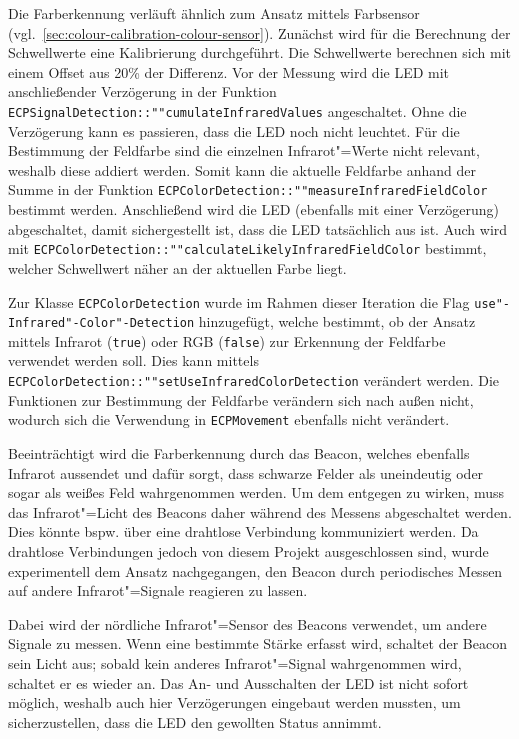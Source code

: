 {Die Farberkennung verläuft ähnlich zum Ansatz mittels Farbsensor (vgl.~\autoref{sec:colour-calibration-colour-sensor}). Zunächst wird für die Berechnung der Schwellwerte eine Kalibrierung durchgeführt.
Die Schwellwerte berechnen sich mit einem Offset aus 20\% der Differenz.
Vor der Messung wird die LED mit anschließender Verzögerung in der Funktion \texttt{ECP\-Signal\-Detection::""cumulate\-Infrared\-Values} angeschaltet. Ohne die Verzögerung kann es passieren, dass die LED noch nicht leuchtet. Für die Bestimmung  der Feldfarbe sind die einzelnen Infrarot"=Werte nicht relevant, weshalb diese addiert werden. Somit kann die aktuelle Feldfarbe anhand der Summe in der Funktion \texttt{ECP\-Color\-Detection::""measure\-Infrared\-Field\-Color} bestimmt werden. Anschließend wird die LED (ebenfalls mit einer Verzögerung) abgeschaltet, damit sichergestellt ist, dass die LED tatsächlich aus ist. Auch wird mit \texttt{ECP\-Color\-Detection::""calculate\-Likely\-Infrared\-Field\-Color} bestimmt, welcher Schwellwert näher an der aktuellen Farbe liegt. 


Zur Klasse \texttt{ECP\-Color\-Detection} wurde im Rahmen dieser Iteration die Flag \texttt{use"-Infrared"-Color"-Detection} hinzugefügt, welche bestimmt, ob der Ansatz mittels Infrarot (\texttt{true}) oder RGB (\texttt{false}) zur Erkennung der Feldfarbe verwendet werden soll. Dies kann mittels \texttt{ECP\-Color\-Detection::""set\-Use\-Infrared\-Color\-Detection} verändert werden. Die Funktionen zur Bestimmung der Feldfarbe verändern sich nach außen nicht, wodurch sich die Verwendung in \texttt{ECP\-Movement} ebenfalls nicht verändert.

Beeinträchtigt wird die Farberkennung durch das Beacon, welches ebenfalls Infrarot aussendet und dafür sorgt, dass schwarze Felder als uneindeutig oder sogar als weißes Feld wahrgenommen werden. Um dem entgegen zu wirken, muss das Infrarot"=Licht des Beacons daher während des Messens abgeschaltet werden. Dies könnte bspw. über eine drahtlose Verbindung kommuniziert werden. Da drahtlose Verbindungen jedoch von diesem Projekt ausgeschlossen sind, wurde experimentell dem Ansatz nachgegangen, den Beacon durch periodisches Messen auf andere Infrarot"=Signale reagieren zu lassen.

Dabei wird der nördliche Infrarot"=Sensor des Beacons verwendet, um andere Signale zu messen. Wenn eine bestimmte Stärke erfasst wird, schaltet der Beacon sein Licht aus; sobald kein anderes Infrarot"=Signal wahrgenommen wird, schaltet er es wieder an. Das An- und Ausschalten der LED ist nicht sofort möglich, weshalb auch hier Verzögerungen eingebaut werden mussten, um sicherzustellen, dass die LED den gewollten Status annimmt.

}
